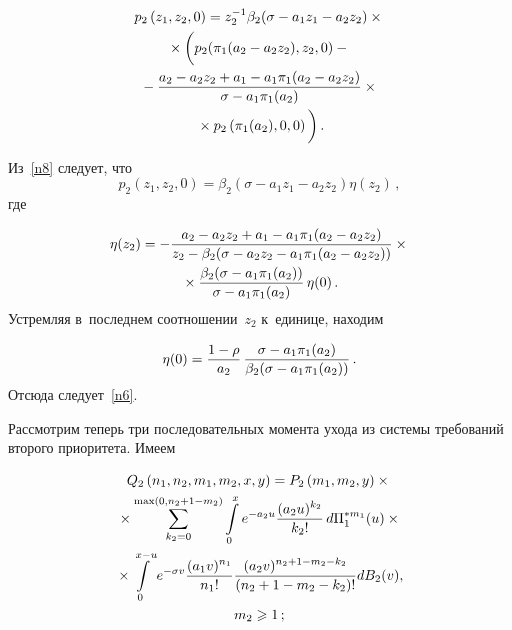\begin{multicols}{2}
\vspace*{-3pt}

\noindent
\begin{multline}
\label{n8}
p_2\left(z_1,z_2,0\right)=z_2^{-1}\beta_2(\sigma-a_1z_1-a_2z_2)\times{}\\
{}\times \left(
\vphantom{\fr{s_1+a_2-a_2w_2+a_1-a_1\pi_1(s_1+a_2-a_2w_2)}{s_1+\sigma-a_1\pi_1(s_1+a_2)}}
p_2(\pi_1(a_2-a_2z_2),z_2,0)-{}\right.\\
{}-
\fr{a_2-a_2z_2+a_1-a_1\pi_1(a_2-a_2z_2)}{\sigma-a_1\pi_1(a_2)}\times{}\\
\left.{}\times
p_2\left(\pi_1(a_2),0,0\right)
\vphantom{\fr{s_1+a_2-a_2w_2+a_1-a_1\pi_1(s_1+a_2-a_2w_2)}{s_1+\sigma-a_1\pi_1(s_1+a_2)}}
\right).
\end{multline}

\vspace*{-3pt}

\noindent
Из~\eqref{n8} следует, что
$$
p_2(z_1,z_2,0)=\beta_2\left(\sigma-a_1z_1-a_2z_2\right)\eta\left(z_2\right)\,,
$$
где

\vspace*{-2pt}

\noindent
\begin{multline*}
\eta(z_2)=-\displaystyle\frac{\displaystyle a_2-a_2z_2+a_1-a_1\pi_1(a_2-a_2z_2)\mathstrut}{\displaystyle z_2-\beta_2(\sigma-a_2z_2-a_1\pi_1(a_2-a_2z_2))\mathstrut}\times{}\\
{}\times
\displaystyle\frac{\displaystyle \beta_2(\sigma-a_1\pi_1(a_2))\mathstrut}{\displaystyle \sigma-a_1\pi_1(a_2)\mathstrut}\,\eta(0)\,.
\end{multline*}
Устремляя в~последнем соотношении~$z_2$ к~единице, находим

\noindent
$$
\eta(0)=\displaystyle\frac{\displaystyle 1-\rho\mathstrut}{\displaystyle a_2\mathstrut}\,\displaystyle\frac{\displaystyle \sigma-a_1\pi_1(a_2)\mathstrut}{\displaystyle \beta_2(\sigma-a_1\pi_1(a_2))\mathstrut}\,.
$$
Отсюда следует~\eqref{n6}.

Рассмотрим теперь три последовательных момента ухода из системы требований 
второго приоритета. Имеем

\noindent
\begin{multline*}
Q_2\left(n_1,n_2,m_1,m_2,x,y\right)=P_2\left(m_1,m_2,y\right)\times{}\\
{}\times \sum\limits_{k_2=0}^{\max(0,n_2+1-m_2)}
\int\limits_0^xe^{-a_2u}\displaystyle\frac{\displaystyle (a_2u)^{k_2}\mathstrut}{\displaystyle k_2!\mathstrut}\,d\Pi_1^{*m_1}(u)
\times{}\\
{}\times \int\limits_0^{x-u}e^{-\sigma v}\displaystyle\frac{\displaystyle (a_1v)^{n_1}\mathstrut}{\displaystyle n_1!\mathstrut}
\displaystyle\frac{\displaystyle (a_2v)^{n_2+1-m_2-k_2}\mathstrut}{\displaystyle (n_2+1-m_2-k_2)!\mathstrut}dB_2(v),\\ m_2\geqslant 1\,;
\end{multline*}

\vspace*{-12pt}


\end{multicols}
